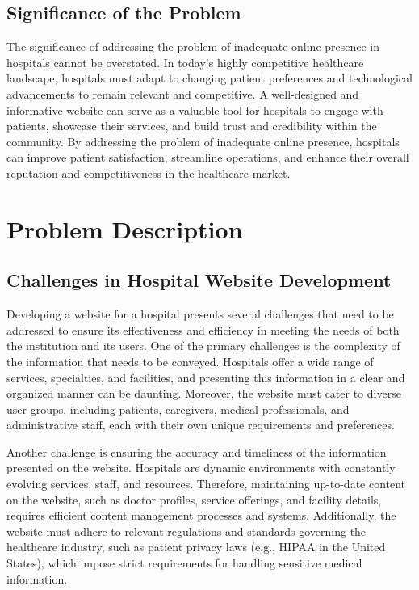 \documentclass{article}
\begin{document}
\subsection{Significance of the Problem}
The significance of addressing the problem of inadequate online presence in hospitals cannot be overstated. In today's highly competitive healthcare landscape, hospitals must adapt to changing patient preferences and technological advancements to remain relevant and competitive. A well-designed and informative website can serve as a valuable tool for hospitals to engage with patients, showcase their services, and build trust and credibility within the community. By addressing the problem of inadequate online presence, hospitals can improve patient satisfaction, streamline operations, and enhance their overall reputation and competitiveness in the healthcare market.

\clearpage

\clearpage

\section{Problem Description} \label{sec:problem_description}
\subsection{Challenges in Hospital Website Development}
Developing a website for a hospital presents several challenges that need to be addressed to ensure its effectiveness and efficiency in meeting the needs of both the institution and its users. One of the primary challenges is the complexity of the information that needs to be conveyed. Hospitals offer a wide range of services, specialties, and facilities, and presenting this information in a clear and organized manner can be daunting. Moreover, the website must cater to diverse user groups, including patients, caregivers, medical professionals, and administrative staff, each with their own unique requirements and preferences.

Another challenge is ensuring the accuracy and timeliness of the information presented on the website. Hospitals are dynamic environments with constantly evolving services, staff, and resources. Therefore, maintaining up-to-date content on the website, such as doctor profiles, service offerings, and facility details, requires efficient content management processes and systems. Additionally, the website must adhere to relevant regulations and standards governing the healthcare industry, such as patient privacy laws (e.g., HIPAA in the United States), which impose strict requirements for handling sensitive medical information.
\end{document}

